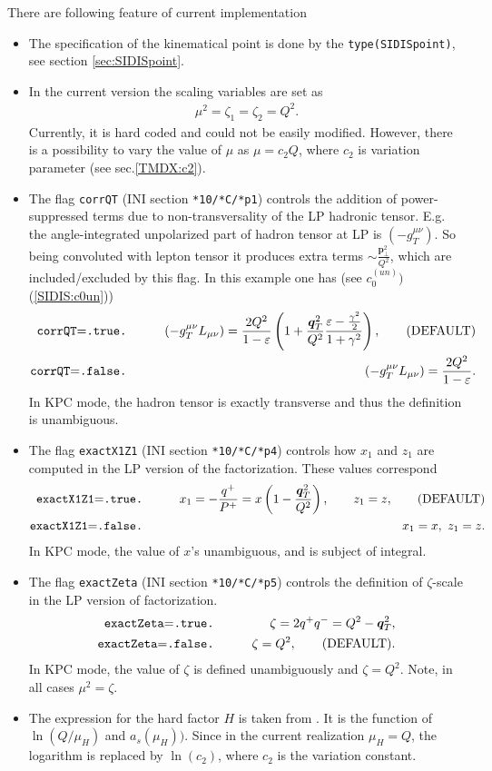 \documentclass[prd,nofootinbib,eqsecnum,final]{revtex4}
\renewcommand{\(}{\left(}
\renewcommand{\)}{\right)}
\renewcommand{\[}{\left[}
\renewcommand{\]}{\right]}
\renewcommand{\vec}[1]{\bm{#1}}
\begin{document}
There are following feature of current implementation
\begin{itemize}
\item The specification of the kinematical point is done by the \texttt{type(SIDISpoint)}, see section \ref{sec:SIDISpoint}.
\item In the current version the scaling variables are set as
\begin{eqnarray}
\mu^2=\zeta_1=\zeta_2=Q^2.
\end{eqnarray}
Currently, it is hard coded and could not be easily modified. However, there is a possibility to vary the value of $\mu$ as $\mu=c_2 Q$, where $c_2$ is variation parameter (see sec.\ref{TMDX:c2}).
\item The flag \texttt{corrQT} (INI section \texttt{*10/*C/*p1}) controls the addition of power-suppressed terms due to non-transversality of the LP hadronic tensor. E.g. the angle-integrated unpolarized part of hadron tensor at LP is $(-g_T^{\mu\nu})$. So being convoluted with lepton tensor it produces extra terms $\sim \frac{\vec p_\perp^2}{Q^2}$, which are included/excluded by this flag. In this example one has (see $c_0^{(un)})$ (\ref{SIDIS:c0un}))
\begin{eqnarray}
\text{\texttt{corrQT}=\texttt{.true.}}&\qquad & (-g_T^{\mu\nu}L_{\mu\nu})=\frac{2Q^2}{1-\varepsilon}\(1+\frac{\vec q_T^2}{Q^2}\frac{\varepsilon -\frac{\gamma^2}{2}}{1+\gamma^2}\),\qquad \text{(DEFAULT)}
\\
\text{\texttt{corrQT}=\texttt{.false.}}&\qquad & (-g_T^{\mu\nu}L_{\mu\nu})=\frac{2Q^2}{1-\varepsilon}.
\end{eqnarray}
In KPC mode, the hadron tensor is exactly transverse and thus the definition is unambiguous.
\item The flag \texttt{exactX1Z1} (INI section \texttt{*10/*C/*p4}) controls how $x_1$ and $z_1$ are computed in the LP version of the factorization. These values correspond
\begin{eqnarray}
\text{\texttt{exactX1Z1}=\texttt{.true.}}&\qquad & x_1=-\frac{q^+}{P^+}=x\(1-\frac{\vec q_T^2}{Q^2}\),\qquad z_1=z,\qquad \text{(DEFAULT)}
\\
\text{\texttt{exactX1Z1}=\texttt{.false.}}&\qquad & x_1=x,~z_1=z.
\end{eqnarray}
In KPC mode, the value of $x$'s unambiguous, and is subject of integral.
\item The flag \texttt{exactZeta} (INI section \texttt{*10/*C/*p5}) controls the definition of $\zeta$-scale in the LP version of factorization.
\begin{eqnarray}
\text{\texttt{exactZeta}=\texttt{.true.}}&\qquad & \zeta=2q^+q^-=Q^2-\vec q_T^2,
\\
\text{\texttt{exactZeta}=\texttt{.false.}}&\qquad & \zeta=Q^2,\qquad \text{(DEFAULT)}.
\end{eqnarray}
In KPC mode, the value of $\zeta$ is defined unambiguously and $\zeta=Q^2$. Note, in all cases $\mu^2=\zeta$.
\item The expression for the hard factor $H$ is taken from \cite{Gehrmann:2010ue}. It is the function of $\ln(Q/\mu_H)$ and $a_s(\mu_H))$. Since in the current realization $\mu_H=Q$, the logarithm is replaced by $\ln(c_2)$, where $c_2$ is the variation constant.
\end{itemize}
\end{document}
